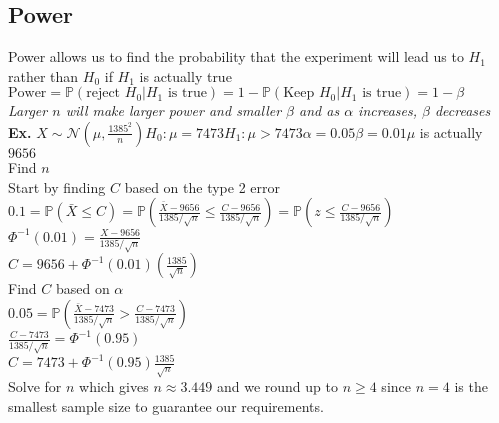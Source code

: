 \documentclass{article}
\begin{document}
\subsection{Power}
\label{sec:hpower}
Power allows us to find the probability that the experiment will lead us to $H_1$ rather than $H_0$ if $H_1$ is actually true\\
$\text{Power}=\mathbb{P}(\text{reject }H_0\vert H_1\text{ is true})=1-\mathbb{P}(\text{Keep }H_0\vert H_1\text{ is true})=1-\beta$\\
\textit{Larger $n$ will make larger power and smaller $\beta$ and as $\alpha$ increases, $\beta$ decreases}\\
\textbf{Ex.} $X\sim\mathcal{N}(\mu,\frac{1385^2}{n})$\hspace*{0.2in}$H_0:\mu=7473$\hspace*{0.2in}$H_1:\mu>7473$\hspace*{0.2in}$\alpha=0.05$\hspace*{0.2in}$\beta=0.01$\hspace*{0.2in}$\mu$ is actually $9656$\\
Find $n$\\
Start by finding $C$ based on the type 2 error\\
$0.1=\mathbb{P}(\bar X\leq C)=\mathbb{P}(\frac{\bar X-9656}{1385/\sqrt{n}}\leq\frac{C-9656}{1385/\sqrt{n}})=\mathbb{P}(z\leq\frac{C-9656}{1385/\sqrt{n}})$\\
$\Phi^{-1}(0.01)=\frac{X-9656}{1385/\sqrt{n}}$\\
$C=9656+\Phi^{-1}(0.01)(\frac{1385}{\sqrt{n}})$\\
Find $C$ based on $\alpha$\\
$0.05=\mathbb{P}(\frac{\bar X-7473}{1385/\sqrt{n}}>\frac{C-7473}{1385/\sqrt{n}})$\\
$\frac{C-7473}{1385/\sqrt{n}}=\Phi^{-1}(0.95)$\\
$C=7473+\Phi^{-1}(0.95)\frac{1385}{\sqrt{n}}$\\
Solve for $n$ which gives $n\approx 3.449$ and we round up to $n\geq4$ since $n=4$ is the smallest sample size to guarantee our requirements. 
\end{document}

